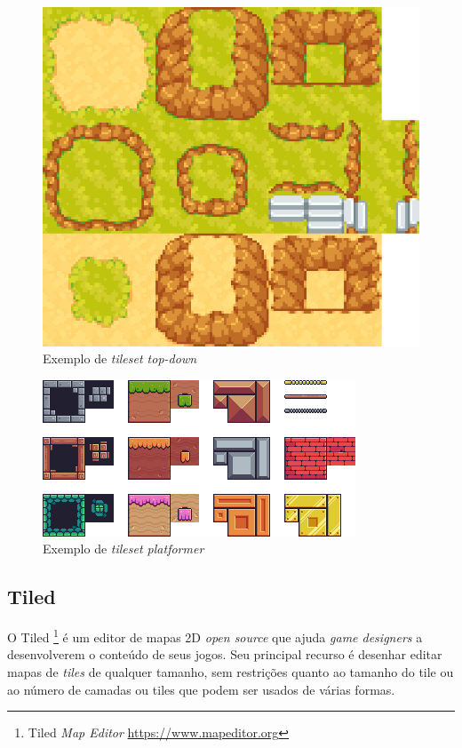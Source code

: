 \begin{figure}[h!]
    \centering
    \includegraphics[width=1\linewidth]{figuras/tileset.png}
    \caption{Exemplo de \textit{tileset top-down}}
    \label{fig:tileset-orthogonal}
\end{figure}
\begin{figure}[h!]
    \centering
    \includegraphics[width=1\linewidth]{figuras/tileset-orthogonal-platform.png}
    \caption{Exemplo de \textit{tileset platformer}}
    \label{fig:tileset-platform-orthogonal}
\end{figure}

\clearpage
\subsection{Tiled}
\label{sec:tiled}
O Tiled \footnote{Tiled \textit{Map Editor} \url{https://www.mapeditor.org}} é um editor de mapas 2D \textit{open source} que ajuda \textit{game designers} a desenvolverem o conteúdo de seus jogos. Seu principal recurso é desenhar editar mapas de \textit{tiles} de qualquer tamanho, sem restrições quanto ao tamanho do tile ou ao número de camadas ou tiles que podem ser usados de várias formas.

